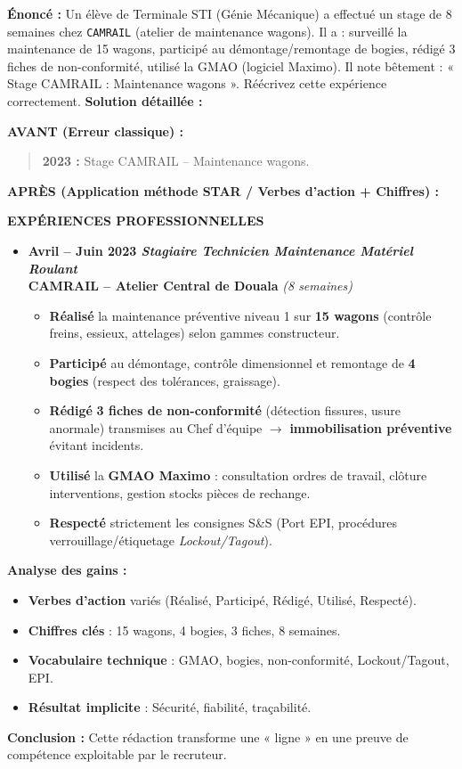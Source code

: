\documentclass[11pt]{article}
\newcommand{\cle}[1]{{\popxbold\color{popdark}#1}}
\begin{document}
\begin{exoresolu}
\textbf{Énoncé :} Un élève de Terminale STI (Génie Mécanique) a effectué un stage de 8 semaines chez \texttt{CAMRAIL} (atelier de maintenance wagons). Il a : surveillé la maintenance de 15 wagons, participé au démontage/remontage de bogies, rédigé 3 fiches de non-conformité, utilisé la GMAO (logiciel Maximo). Il note bêtement : « Stage CAMRAIL : Maintenance wagons ». Réécrivez cette expérience correctement.
\tcblower
\textbf{Solution détaillée :}

\textbf{AVANT (Erreur classique) :}
\begin{quote}
\textbf{2023 :} Stage CAMRAIL -- Maintenance wagons.
\end{quote}

\textbf{APRÈS (Application méthode STAR / Verbes d'action + Chiffres) :}

\textbf{EXPÉRIENCES PROFESSIONNELLES}
\begin{itemize}
    \item \textbf{Avril -- Juin 2023 \hfill \emph{Stagiaire Technicien Maintenance Matériel Roulant}} \\
    \textbf{CAMRAIL -- Atelier Central de Douala} \hfill \emph{(8 semaines)}
    \begin{itemize}
        \item \textbf{Réalisé} la maintenance préventive niveau 1 sur \textbf{15 wagons} (contrôle freins, essieux, attelages) selon gammes constructeur.
        \item \textbf{Participé} au démontage, contrôle dimensionnel et remontage de \textbf{4 bogies} (respect des tolérances, graissage).
        \item \textbf{Rédigé} \textbf{3 fiches de non-conformité} (détection fissures, usure anormale) transmises au Chef d'équipe $\to$ \textbf{immobilisation préventive} évitant incidents.
        \item \textbf{Utilisé} la \textbf{GMAO Maximo} : consultation ordres de travail, clôture interventions, gestion stocks pièces de rechange.
        \item \textbf{Respecté} strictement les consignes S\&S (Port EPI, procédures verrouillage/étiquetage \emph{Lockout/Tagout}).
    \end{itemize}
\end{itemize}

\textbf{Analyse des gains :}
\begin{itemize}
    \item \textbf{Verbes d'action} variés (Réalisé, Participé, Rédigé, Utilisé, Respecté).
    \item \textbf{Chiffres clés} : 15 wagons, 4 bogies, 3 fiches, 8 semaines.
    \item \textbf{Vocabulaire technique} : GMAO, bogies, non-conformité, Lockout/Tagout, EPI.
    \item \textbf{Résultat implicite} : Sécurité, fiabilité, traçabilité.
\end{itemize}
\textbf{Conclusion :} Cette rédaction transforme une « ligne » en une \cle{preuve de compétence} exploitable par le recruteur.
\end{exoresolu}
\end{document}
